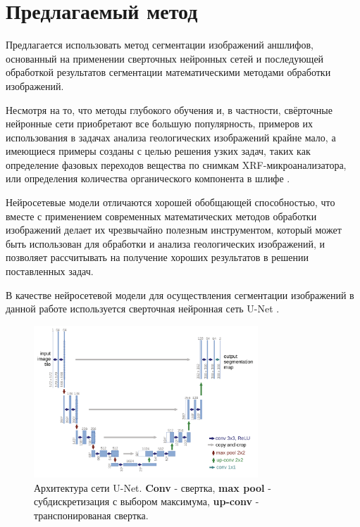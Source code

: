 \section{Предлагаемый метод}
Предлагается использовать метод сегментации изображений аншлифов, основанный на применении сверточных нейронных сетей и последующей обработкой результатов сегментации математическими методами обработки изображений. \par Несмотря на то, что методы глубокого обучения и, в частности, свёрточные нейронные сети приобретают все большую популярность,  примеров их использования в задачах анализа геологических изображений крайне мало, а имеющиеся примеры созданы с целью решения узких задач, таких как определение фазовых переходов вещества по снимкам XRF-микроанализатора, или определения количества органического компонента в шлифе \cite{osnkonstrmeh, disser1}. \par Нейросетевые модели отличаются хорошей обобщающей способностью, что вместе с применением современных математических методов обработки изображений делает их чрезвычайно полезным инструментом, который может быть использован для обработки и анализа геологических изображений, и позволяет рассчитывать на получение хороших результатов в решении поставленных задач.
\par В качестве нейросетевой модели для осуществления сегментации изображений в данной работе используется сверточная нейронная сеть U-Net \cite{ronneberger2015u}.
\newline
\begin{figure}[H]
    \centering
    \includegraphics[width=0.75\textwidth]{pics/u-net.png}
    \caption{Архитектура сети U-Net. \textbf{Conv} - свертка, \textbf{max pool} - субдискретизация с выбором максимума, \textbf{up-conv} - транспонированая свертка.}
    \label{fig:unet}
\end{figure}

